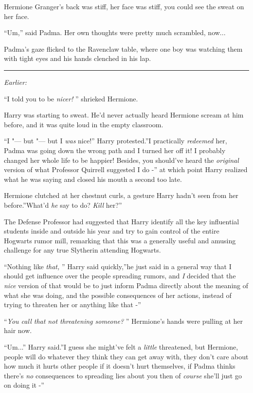 Hermione Granger's back was stiff, her face was stiff, you could see the
sweat on her face.

``Um,'' said Padma. Her own thoughts were pretty much scrambled,
now...

Padma's gaze flicked to the Ravenclaw table, where one boy was watching
them with tight eyes and his hands clenched in his lap.

\begin{center}\rule{3in}{0.4pt}\end{center}

\emph{Earlier:}

``I told you to be \emph{nicer!} '' shrieked Hermione.

Harry was starting to sweat. He'd never actually heard Hermione scream
at him before, and it was quite loud in the empty classroom.

``I "--- but "--- but I \emph{was} nice!'' Harry protested.''I practically
\emph{redeemed} her, Padma was going down the wrong path and I turned
her off it! I probably changed her whole life to be happier! Besides,
you should've heard the \emph{original} version of what Professor
Quirrell suggested I do -'' at which point Harry realized what he was
saying and closed his mouth a second too late.

Hermione clutched at her chestnut curls, a gesture Harry hadn't seen
from her before.''What'd \emph{he} say to do? \emph{Kill} her?''

The Defense Professor had suggested that Harry identify all the key
influential students inside and outside his year and try to gain control
of the entire Hogwarts rumor mill, remarking that this was a generally
useful and amusing challenge for any true Slytherin attending Hogwarts.

``Nothing like \emph{that,} '' Harry said quickly,''he just said in a
general way that I should get influence over the people spreading
rumors, and \emph{I} decided that the \emph{nice} version of that would
be to just inform Padma directly about the meaning of what she was
doing, and the possible consequences of her actions, instead of trying
to threaten her or anything like that -''

``\emph{You call that not threatening someone?} '' Hermione's hands were
pulling at her hair now.

``Um...'' Harry said.''I guess she might've felt a \emph{little}
threatened, but Hermione, people will do whatever they think they can
get away with, they don't care about how much it hurts other people if
it doesn't hurt themselves, if Padma thinks there's \emph{no}
consequences to spreading lies about you then of \emph{course} she'll
just go on doing it -''

